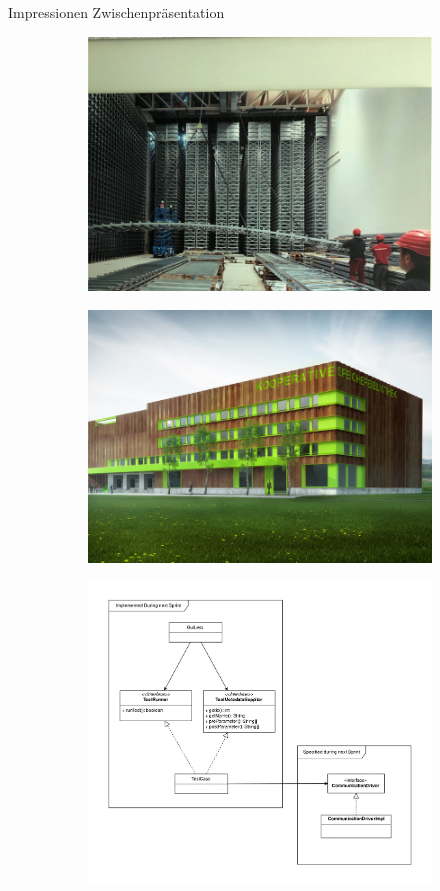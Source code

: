 \documentclass{beamer}
\begin{document}
\begin{frame}{Impressionen Zwischenpräsentation}
\begin{figure}
    \centering
    \begin{subfigure}{0.45\linewidth}
        \includegraphics[width=0.8\linewidth]{img/Hochregallager}
    \end{subfigure}
    \begin{subfigure}{0.45\linewidth}
        \includegraphics[width=0.8\linewidth]{img/Speicherbibliothek}
    \end{subfigure}
    \vspace{5em}
    \begin{subfigure}{0.7\linewidth}
        \includegraphics[width=0.7\linewidth]{img/Testframework}
    \end{subfigure}
\end{figure}
\end{frame}
\end{document}
